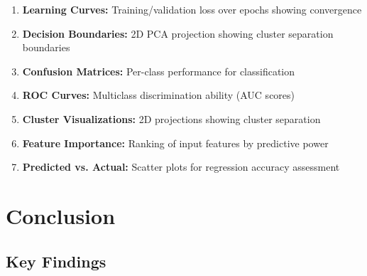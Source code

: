 \documentclass[11pt,a4paper]{article}
\begin{document}
\begin{enumerate}
    \item \textbf{Learning Curves:} Training/validation loss over epochs showing convergence
    \item \textbf{Decision Boundaries:} 2D PCA projection showing cluster separation boundaries
    \item \textbf{Confusion Matrices:} Per-class performance for classification
    \item \textbf{ROC Curves:} Multiclass discrimination ability (AUC scores)
    \item \textbf{Cluster Visualizations:} 2D projections showing cluster separation
    \item \textbf{Feature Importance:} Ranking of input features by predictive power
    \item \textbf{Predicted vs. Actual:} Scatter plots for regression accuracy assessment
\end{enumerate}

\section{Conclusion}

\subsection{Key Findings}
\end{document}
